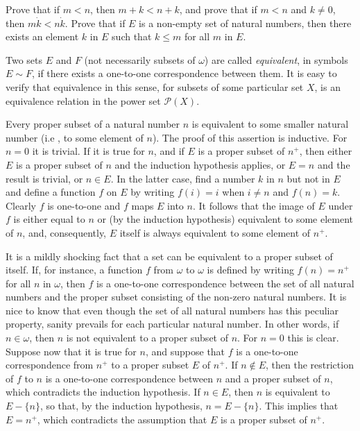 \begin{exercise} Prove that if $m < n$, then $m + k < n + k$, and prove that if $m < n$ and $k \neq 0$, then $m \dot k <n \dot k$. Prove that if $E$ is a non-empty set of natural numbers, then there exists an element $k$ in $E$ such that $k \le m$ for all $m$ in $E$. 
\end{exercise}

Two sets $E$ and $F$ (not necessarily subsets of $\omega$) are called \textit{equivalent}, in symbols $E \sim F$, if there exists a one-to-one correspondence between them. It is easy to verify that equivalence in this sense, for subsets of some particular set $X$, is an equivalence relation in the power set $\mathcal{P}(X)$.

Every proper subset of a natural number $n$ is equivalent to some smaller natural number (i.e , to some element of $n$). The proof of this assertion is inductive. For $n = 0$ it is trivial. If it is true for $n$, and if $E$ is a proper subset of $n^{+}$, then either $E$ is a proper subset of $n$ and the induction hypothesis applies, or $E = n$ and the result is trivial, or $n \in E$. In the latter case, find a number $k$ in $n$ but not in $E$ and define a function $f$ on $E$ by writing $f(i) = i$ when $i \neq n$ and $f(n) = k$. Clearly $f$ is one-to-one and $f$ maps $E$ into $n$. It follows that the image of $E$ under $f$ is either equal to $n$ or (by the induction hypothesis) equivalent to some element of $n$, and, consequently, $E$ itself is always equivalent to some element of $n^{+}$. 

It is a mildly shocking fact that a set can be equivalent to a proper subset of itself. If, for instance, a function $f$ from $\omega$ to $\omega$ is defined by writing $f(n) = n^{+}$ for all $n$ in $\omega$, then $f$ is a one-to-one correspondence between the set of all natural numbers and the proper subset consisting of the non-zero natural numbers. It is nice to know that even though the set of all natural numbers has this peculiar property, sanity prevails for each particular natural number. In other words, if $n \in \omega$, then $n$ is not equivalent to a proper subset of $n$. For $n = 0$ this is clear. Suppose now that it is true for $n$, and suppose that $f$ is a one-to-one correspondence from $n^{+}$ to a proper subset $E$ of $n^{+}$. If $n \notin E$, then the restriction of $f$ to $n$ is a one-to-one correspondence between $n$ and a proper subset of $n$, which contradicts the induction hypothesis. If $n \in E$, then $n$ is equivalent to $E - \{ n \}$, so that, by the induction hypothesis, $n = E - \{ n \}$. This implies that $E = n^{+}$, which contradicts the assumption that $E$ is a proper subset of $n^{+}$. 

